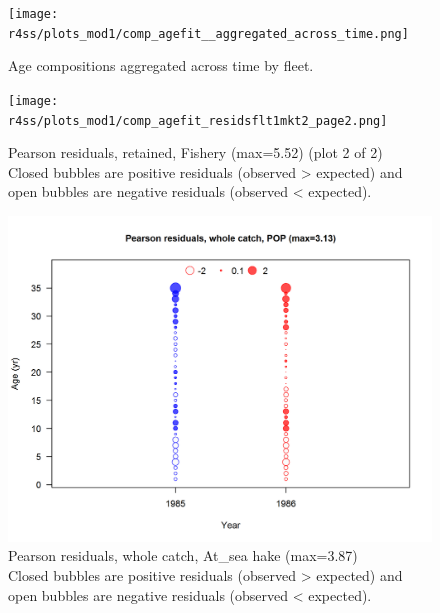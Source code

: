 \documentclass[12pt,]{article}
\begin{document}
\FloatBarrier

\begin{figure}
\centering
\texttt{[image: r4ss/plots\_mod1/comp\_agefit\_\_aggregated\_across\_time.png]}
\caption{Age compositions aggregated across time by fleet.
\label{fig:age_agg}}
\end{figure}

\begin{figure}
\centering
\texttt{[image: r4ss/plots\_mod1/comp\_agefit\_residsflt1mkt2\_page2.png]}
\caption{Pearson residuals, retained, Fishery (max=5.52) (plot 2 of 2)\\
Closed bubbles are positive residuals (observed \textgreater{} expected)
and open bubbles are negative residuals (observed \textless{} expected).
\label{fig:fishery_age_pearson}}
\end{figure}

\begin{figure}
\centering
\includegraphics{r4ss/plots_mod1/comp_agefit_residsflt2mkt0.png}
\caption{Pearson residuals, whole catch, At\_sea hake (max=3.87)\\
Closed bubbles are positive residuals (observed \textgreater{} expected)
and open bubbles are negative residuals (observed \textless{} expected).
\label{fig:ashop_age_pearson}}
\end{figure}
\end{document}
